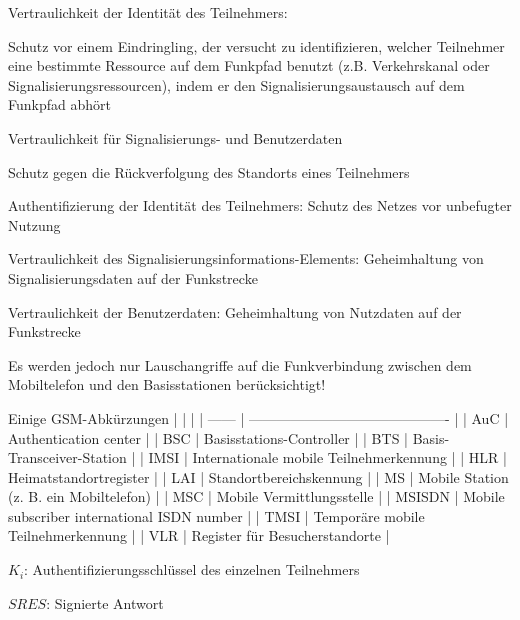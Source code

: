\documentclass[a4paper]{article}
\begin{document}
\begin{multicols}{3}
\begin{itemize*}
\begin{itemize*}
                  \item Vertraulichkeit der Identität des Teilnehmers:
                  \begin{itemize*}
                        \item Schutz vor einem Eindringling, der versucht zu identifizieren, welcher Teilnehmer eine bestimmte Ressource auf dem Funkpfad benutzt (z.B. Verkehrskanal oder Signalisierungsressourcen), indem er den Signalisierungsaustausch auf dem Funkpfad abhört
                        \item Vertraulichkeit für Signalisierungs- und Benutzerdaten
                        \item Schutz gegen die Rückverfolgung des Standorts eines Teilnehmers
                  \end{itemize*}
                  \item Authentifizierung der Identität des Teilnehmers: Schutz des Netzes vor unbefugter Nutzung
                  \item Vertraulichkeit des Signalisierungsinformations-Elements: Geheimhaltung von Signalisierungsdaten auf der Funkstrecke
                  \item Vertraulichkeit der Benutzerdaten: Geheimhaltung von Nutzdaten auf der Funkstrecke
                  \item Es werden jedoch nur Lauschangriffe auf die Funkverbindung zwischen dem Mobiltelefon und den Basisstationen berücksichtigt!
            \end{itemize*}
      \end{itemize*}

      Einige GSM-Abkürzungen | | | |
      ------ |
      -------------------------------------------
      | | AuC | Authentication center |
      | BSC | Basisstations-Controller | |
      BTS | Basis-Transceiver-Station | | IMSI
      | Internationale mobile Teilnehmerkennung | |
      HLR | Heimatstandortregister | | LAI
      | Standortbereichskennung | | MS |
      Mobile Station (z. B. ein Mobiltelefon) | | MSC
      | Mobile Vermittlungsstelle | | MSISDN
      | Mobile subscriber international ISDN number |
      | TMSI | Temporäre mobile Teilnehmerkennung |
      | VLR | Register für Besucherstandorte |



      \begin{itemize*}
            \item $K_i$: Authentifizierungsschlüssel des einzelnen Teilnehmers
            \item $SRES$: Signierte Antwort
      \end{itemize*}


\end{multicols}
\end{document}
